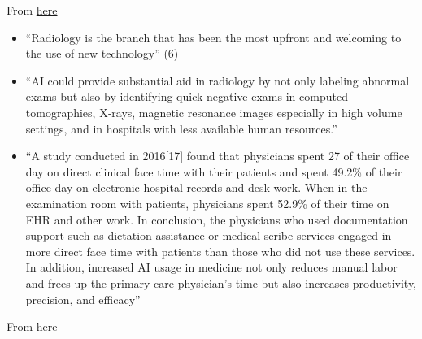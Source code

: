 \documentclass[11pt]{article}
\begin{document}
From \href{https://www.ncbi.nlm.nih.gov/pmc/articles/PMC6691444/pdf/JFMPC-8-2328.pdf}{here} \cite{overview-of-ai-medicine}

\begin{itemize}
    \item ``Radiology is the branch that has been the most upfront
    and welcoming to the use of new technology'' (6)
    \item ``AI could provide substantial aid in radiology by not
    only labeling abnormal exams but also by identifying quick negative
    exams in computed tomographies, X‑rays, magnetic resonance
    images especially in high volume settings, and in hospitals with
    less available human resources.''
    \item  ``A study conducted in 2016[17] found that physicians spent 27%
    of their office day on direct clinical face time with their patients
    and spent 49.2\% of their office day on electronic hospital records
    and desk work. When in the examination room with patients,
    physicians spent 52.9\% of their time on EHR and other work. In
    conclusion, the physicians who used documentation support such
    as dictation assistance or medical scribe services engaged in more
    direct face time with patients than those who did not use these
    services. In addition, increased AI usage in medicine not only
    reduces manual labor and frees up the primary care physician’s
    time but also increases productivity, precision, and efficacy''
\end{itemize}

From \href{https://onlinelibrary.wiley.com/doi/10.1002/cac2.12215}{here} \cite{AI-in-cancer-diagnosis-era}
\end{document}
